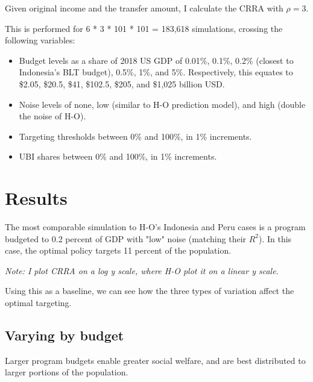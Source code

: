 \documentclass[12pt]{article}
\begin{document}
Given original income and the transfer amount, I calculate the CRRA with 
$\rho=3$.

This is performed for 6 * 3 * 101 * 101 = 183,618 simulations, crossing the 
following variables:

\begin{itemize}
	
	\item Budget levels as a share of 2018 US GDP of 0.01\%, 0.1\%, 0.2\% 
	(closest to 
	Indonesia's BLT budget), 0.5\%, 1\%, and 5\%. Respectively, this equates to 
	\$2.05, \$20.5, \$41, \$102.5, \$205, and \$1,025 billion USD.
	
	\item Noise levels of none, low (similar to H-O prediction model), and high 
	(double the noise of H-O).
	
	\item Targeting thresholds between 0\% and 100\%, in 1\% increments.
	
	\item UBI shares between 0\% and 100\%, in 1\% increments.
	
\end{itemize}


\section{Results} \label{sec:results}

The most comparable simulation to H-O's Indonesia and Peru cases is a program 
budgeted to 0.2 percent of GDP with "low" noise (matching their $R^2$). In this 
case, the optimal policy targets 11 percent of the population. 

\begin{center}
\label{fig:pov_rate_income}
\end{center}

\emph{Note: I plot CRRA on a log y scale, where H-O plot it on a linear y 
scale.}

Using this as a baseline, we can see how the three types of variation affect 
the optimal targeting.

\subsection{Varying by budget} \label{varying_by_budget}

Larger program budgets enable greater social welfare, and are best distributed 
to larger portions of the population.
\end{document}
